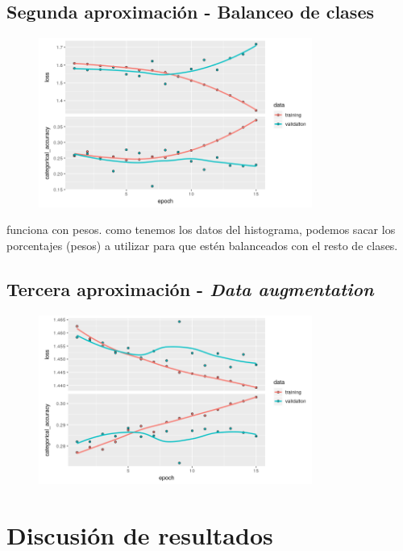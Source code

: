 \documentclass[]{article}
\begin{document}
	\subsection{Segunda aproximación - Balanceo de clases}
	
		\begin{figure}[h]
			\centering
			\includegraphics[width=0.8\textwidth]{./img/model2}
			\caption{}
			\label{}
		\end{figure}
	
	funciona con pesos. como tenemos los datos del histograma, podemos sacar los porcentajes (pesos) a utilizar para que estén balanceados con el resto de clases.
	
	\subsection{Tercera aproximación - \textit{Data augmentation}}
	
		\begin{figure}[h]
			\centering
			\includegraphics[width=0.8\textwidth]{./img/model3}
			\caption{}
			\label{}
		\end{figure}
	
\section{Discusión de resultados}
\end{document}
